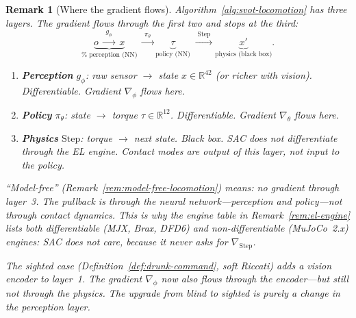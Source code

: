 \documentclass[11pt,a4paper]{article}
\newtheorem{remark}[theorem]{Remark}
\newcommand{\R}{\mathbb{R}}
\begin{document}
\begin{remark}[Where the gradient flows]
\label{rem:gradient-flow}
Algorithm~\ref{alg:svot-locomotion} has three layers.
The gradient flows through the first two and
\emph{stops} at the third:
\[
  \underbrace{o \;\xrightarrow{\;g_\phi\;}\; x}_{\text{%
    perception (NN)}}
  \;\xrightarrow{\;\pi_\theta\;}
  \underbrace{\tau}_{\text{policy (NN)}}
  \;\xrightarrow{\;\mathrm{Step}\;}
  \underbrace{x'}_{\text{physics (black box)}}.
\]
\begin{enumerate}[nosep]
\item \textbf{Perception} $g_\phi$:\;
  raw sensor $\to$ state $x \in \R^{42}$
  (or richer with vision).
  Differentiable.
  Gradient $\nabla_\phi$ flows here.
\item \textbf{Policy} $\pi_\theta$:\;
  state $\to$ torque $\tau \in \R^{12}$.
  Differentiable.
  Gradient $\nabla_\theta$ flows here.
\item \textbf{Physics} $\mathrm{Step}$:\;
  torque $\to$ next state.
  Black box.
  SAC does \emph{not} differentiate through the EL engine.
  Contact modes are \emph{output} of this layer,
  not input to the policy.
\end{enumerate}
``Model-free'' (Remark~\ref{rem:model-free-locomotion})
means: no gradient through layer~3.
The pullback is through the neural network---perception
and policy---not through contact dynamics.
This is why the engine table in
Remark~\ref{rem:el-engine}
lists both differentiable (MJX, Brax, DFD6)
and non-differentiable (MuJoCo~2.x) engines:
\emph{SAC does not care},
because it never asks for $\nabla_{\mathrm{Step}}$.

\medskip\noindent
The sighted case
(Definition~\ref{def:drunk-command}, soft Riccati)
adds a vision encoder to layer~1.
The gradient $\nabla_\phi$ now also flows through
the encoder---but still not through the physics.
The upgrade from blind to sighted is purely
a change in the perception layer.
\end{remark}

\end{document}
